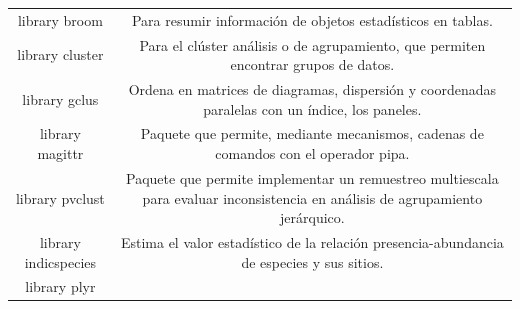 \documentclass[11pt,]{article}
\begin{document}
\begin{longtable}[]{@{}cc@{}}
\begin{minipage}[t]{0.14\columnwidth}
library broom\strut
\end{minipage} & \begin{minipage}[t]{0.80\columnwidth}\centering\strut
Para resumir información de objetos estadísticos en tablas.\strut
\end{minipage}\tabularnewline
\begin{minipage}[t]{0.14\columnwidth}\centering\strut
library cluster\strut
\end{minipage} & \begin{minipage}[t]{0.80\columnwidth}\centering\strut
Para el clúster análisis o de agrupamiento, que permiten encontrar
grupos de datos.\strut
\end{minipage}\tabularnewline
\begin{minipage}[t]{0.14\columnwidth}\centering\strut
library gclus\strut
\end{minipage} & \begin{minipage}[t]{0.80\columnwidth}\centering\strut
Ordena en matrices de diagramas, dispersión y coordenadas paralelas con
un índice, los paneles.\strut
\end{minipage}\tabularnewline
\begin{minipage}[t]{0.14\columnwidth}\centering\strut
library magittr\strut
\end{minipage} & \begin{minipage}[t]{0.80\columnwidth}\centering\strut
Paquete que permite, mediante mecanismos, cadenas de comandos con el
operador pipa.\strut
\end{minipage}\tabularnewline
\begin{minipage}[t]{0.14\columnwidth}\centering\strut
library pvclust\strut
\end{minipage} & \begin{minipage}[t]{0.80\columnwidth}\centering\strut
Paquete que permite implementar un remuestreo multiescala para evaluar
inconsistencia en análisis de agrupamiento jerárquico.\strut
\end{minipage}\tabularnewline
\begin{minipage}[t]{0.14\columnwidth}\centering\strut
library indicspecies\strut
\end{minipage} & \begin{minipage}[t]{0.80\columnwidth}\centering\strut
Estima el valor estadístico de la relación presencia-abundancia de
especies y sus sitios.\strut
\end{minipage}\tabularnewline
\begin{minipage}[t]{0.14\columnwidth}\centering\strut
library plyr\strut

\end{minipage}
\end{longtable}
\end{document}
